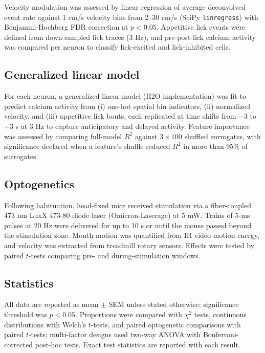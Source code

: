 \documentclass[11pt]{article}
\begin{document}
Velocity modulation was assessed by linear regression of average deconvolved event rate against 1 cm/s velocity bins from 2--30 cm/s (SciPy \texttt{linregress}) with Benjamini-Hochberg FDR correction at $p<0.05$. Appetitive lick events were defined from down-sampled lick traces (3 Hz), and pre-post-lick calcium activity was compared per neuron to classify lick-excited and lick-inhibited cells.

\subsection{Generalized linear model}

For each neuron, a generalized linear model (H2O implementation) was fit to predict calcium activity from (i) one-hot spatial bin indicators, (ii) normalized velocity, and (iii) appetitive lick bouts, each replicated at time shifts from $-3$ to $+3$ s at 3 Hz to capture anticipatory and delayed activity. Feature importance was assessed by comparing full-model $R^2$ against $3\times100$ shuffled surrogates, with significance declared when a feature's shuffle reduced $R^2$ in more than 95\% of surrogates.

\subsection{Optogenetics}

Following habituation, head-fixed mice received stimulation via a fiber-coupled 473 nm LuxX 473-80 diode laser (Omicron-Laserage) at 5 mW. Trains of 5-ms pulses at 20 Hz were delivered for up to 10 s or until the mouse passed beyond the stimulation zone. Mouth motion was quantified from IR video motion energy, and velocity was extracted from treadmill rotary sensors. Effects were tested by paired $t$-tests comparing pre- and during-stimulation windows.

\subsection{Statistics}

All data are reported as mean $\pm$ SEM unless stated otherwise; significance threshold was $p<0.05$. Proportions were compared with $\chi^2$ tests, continuous distributions with Welch's $t$-tests, and paired optogenetic comparisons with paired $t$-tests; multi-factor designs used two-way ANOVA with Bonferroni-corrected post-hoc tests. Exact test statistics are reported with each result.



\end{document}
